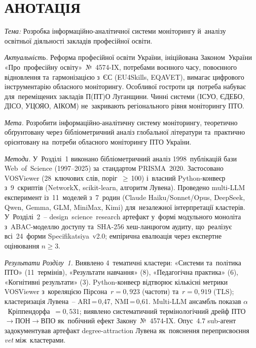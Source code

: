 
\section*{\centering \MakeUppercase{Анотація}}

\textit{Тема:} Розробка інформаційно-аналітичної системи моніторингу й~аналізу освітньої діяльності закладів професійної освіти.

\textit{Актуальність.} Реформа професійної освіти України, ініційована Законом~України «Про~професійну освіту»~№~4574-IX, потребами воєнного часу, повоєнного відновлення та~гармонізацією з~ЄС (EU4Skills, EQAVET), вимагає цифрового інструментарію обласного моніторингу. Особливої гостроти ця~потреба набуває для~переміщених закладів П(ПТ)О Луганщини. Чинні системи (ІСУО, ЄДЕБО, ДІСО, УЦОЯО, АІКОМ) не~закривають регіонального рівня моніторингу ПТО.

\textit{Мета.} Розробити інформаційно-аналітичну систему моніторингу, теоретично обґрунтовану через бібліометричний аналіз глобальної літератури та~практично орієнтовану на~потреби обласного моніторингу ПТО України.

\textit{Методи.} У~Розділі~1 виконано бібліометричний аналіз 1998~публікацій бази Web~of~Science (1997--2025) за~стандартом PRISMA~2020. Застосовано VOSViewer (28~ключових слів, поріг~$\geq$\,100) і~власний Python-конвеєр з~9~скриптів (NetworkX, scikit-learn, алгоритм Лувена). Проведено multi-LLM експеримент із~11~моделей з~7~родин (Claude Haiku/Sonnet/Opus, DeepSeek, Qwen, Gemma, GLM, MiniMax, Kimi) для~незалежної інтерпретації кластерів. У~Розділі~2~-- design~science~research артефакт у~формі модульного моноліта з~ABAC-моделлю доступу та~SHA-256 хеш-ланцюгом аудиту, що~реалізує всі~24~форми Specifikatsiya~v2.0; емпірична евалюація через експертне оцінювання $n\geq 3$.

\textit{Результати Розділу~1.} Виявлено 4~тематичні кластери: «Системи та~політика ПТО» (11~термінів), «Результати навчання» (8), «Педагогічна практика» (6), «Когнітивні результати» (3). Python-конвеєр відтворює кількісні метрики VOSViewer з~кореляцією Пірсона~$r=0{,}923$ (частоти) та~$r=0{,}919$ (TLS); кластеризація Лувена~-- ARI\,=\,0,47, NMI\,=\,0,61. Multi-LLM ансамбль показав $\alpha$~Кріппендорфа~$=0{,}531$; виявлено систематичний термінологічний дрейф ПТО$\to$ПОН$\to$ВПО як~побічний ефект Закону~№~4574-IX. Опус~4.7 sub-агент задокументував артефакт degree-attraction Лувена як~пояснення переприсвоєння \textit{vet} між~кластерами.

